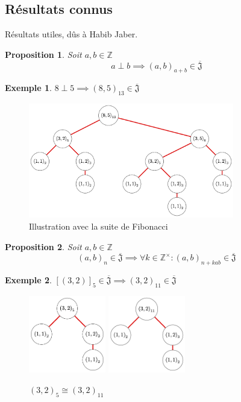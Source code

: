\documentclass{article}
\newtheorem{proposition}{Proposition}
\newtheorem{example}{Exemple}
\newcommand{\J}{\mathfrak{J}}
\newcommand{\JS}{\overline{\J}}
\begin{document}
\newpage

\subsection{Résultats connus}
Résultats utiles, dûs à Habib Jaber.

\begin{proposition}
    Soit $a, b \in \mathbb{Z}$
    \[ a \perp b \implies {(a, b)}_{a + b} \in \JS \]
\end{proposition}

\begin{example}
    $8 \perp 5 \implies {(8, 5)}_{13} \in \JS$
\end{example}
\begin{figure}[h]
    \caption{Illustration avec la suite de Fibonacci}
    \centering
    \includegraphics[width=0.8\textwidth]{fibo}
\end{figure}

\begin{proposition}
    Soit $a, b \in \mathbb{Z}$
    \[ {(a, b)}_n \in \JS \implies \forall k \in \mathbb{Z}^\times : {(a, b)}_{n+kab} \in \JS \]
\end{proposition}

\begin{example}
    ${[(3, 2)]}_5 \in \JS \implies {(3, 2)}_{11} \in \JS$
\end{example}

\begin{figure}[h]
    \caption{${(3, 2)}_5 \cong {(3, 2)}_{11}$}
    \centering
    \includegraphics[width=0.3\textwidth]{532}
    \includegraphics[width=0.3\textwidth]{11_3_2}
\end{figure}
\end{document}
